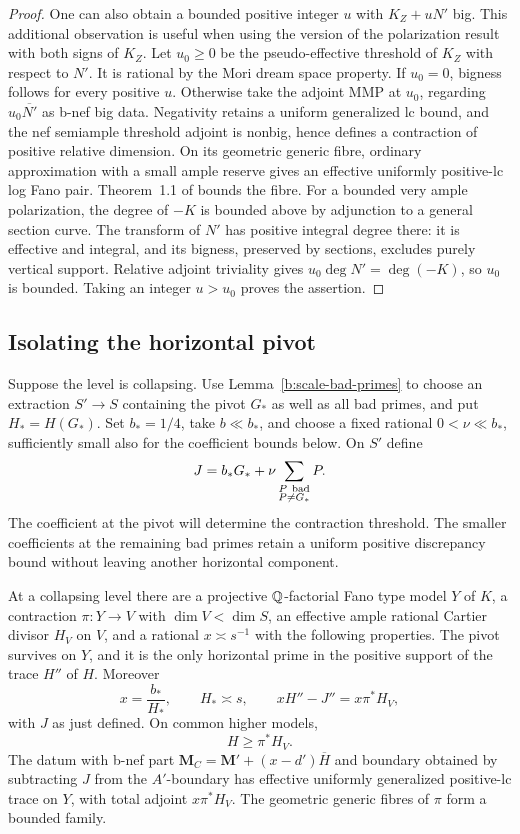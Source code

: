 \begin{proof}
One can also obtain a bounded positive integer $u$ with $K_Z+uN'$ big.
This additional observation is useful when using the version of the
polarization result with both signs of $K_Z$.  Let $u_0\ge0$ be the
pseudo-effective threshold of $K_Z$ with respect to $N'$.  It is
rational by the Mori dream space property.  If $u_0=0$, bigness follows
for every positive $u$.  Otherwise take the adjoint MMP at $u_0$,
regarding $u_0\overline{N'}$ as b-nef big data.  Negativity retains a
uniform generalized lc bound, and the nef semiample threshold adjoint
is nonbig, hence defines a contraction of positive relative dimension.
On its geometric generic fibre, ordinary approximation with a small
ample reserve gives an effective uniformly positive-lc log Fano pair.
Theorem~1.1 of \cite{BirkarBAB} bounds the fibre.  For a bounded very
ample polarization, the degree of $-K$ is bounded above by adjunction
to a general section curve.  The transform of $N'$ has positive integral
degree there: it is effective and integral, and its bigness, preserved
by sections, excludes purely vertical support.  Relative adjoint
triviality gives $u_0\deg N'=\deg(-K)$, so $u_0$ is bounded.
Taking an integer $u>u_0$ proves the assertion.
\end{proof}

\subsection{Isolating the horizontal pivot}

Suppose the level is collapsing. Use
Lemma~\ref{b:scale-bad-primes} to choose an extraction $S'\to S$
containing the pivot $G_*$ as well as all bad primes, and put
$H_*=H(G_*)$. Set $b_*=1/4$, take $b\ll b_*$, and choose a fixed
rational $0<\nu\ll b_*$, sufficiently small also for the coefficient
bounds below. On $S'$ define
\[
 J=b_*G_*+\nu\sum_{\substack{P\ {\rm bad}\\P\ne G_*}}P.
\]
The coefficient at the pivot will determine the contraction threshold.
The smaller coefficients at the remaining bad primes retain a uniform
positive discrepancy bound without leaving another horizontal component.

\begin{lemma}\label{b:scale-collapse}
At a collapsing level there are a projective $\mathbb Q$-factorial Fano type
model $Y$ of $K$, a contraction $\pi:Y\to V$ with $\dim V<\dim S$,
an effective ample rational Cartier divisor $H_V$ on $V$, and a rational
$x\asymp s^{-1}$ with the following properties.  The pivot survives on
$Y$, and it is the only horizontal prime in the positive support of the
trace $H''$ of $H$.  Moreover
\[
 x=\frac{b_*}{H_*},\qquad H_*\asymp s,
 \qquad xH''-J''=x\pi^*H_V,
\]
with $J$ as just defined. On common higher models,
\begin{equation}\label{eq:B4}
                          H\ge\pi^*H_V.
\end{equation}
The datum with b-nef part
$\mathbf M_C=\mathbf M'+(x-d')\overline H$ and boundary obtained by
subtracting $J$ from the $A'$-boundary has effective uniformly
generalized positive-lc trace on $Y$, with total adjoint $x\pi^*H_V$.
The geometric generic fibres of $\pi$ form a bounded family.
\end{lemma}

